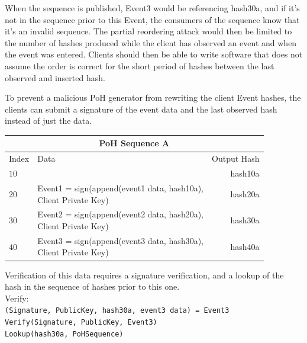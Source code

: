 \documentclass[12pt]{article}
\begin{document}
When the sequence is published, Event3 would be referencing hash30a, and if it’s not in the sequence prior to this Event, the consumers of the sequence know that it’s an invalid sequence. The partial reordering attack would then be limited to the number of hashes produced while the client has observed an event and when the event was entered. Clients should then be able to write software that does not assume the order is correct for the short period of hashes between the last observed and inserted hash.

To prevent a malicious PoH generator from rewriting the client Event hashes, the clients can submit a signature of the event data and the last observed hash instead of just the data.\\
\begin{center}
  \begin{tabular}{  l  l  r }
    \multicolumn{3}{c}{PoH Sequence A} \\
    \hline
    Index & Data & Output Hash \\ \hline
    $10$ & & hash10a  \\
    $20$ & \makecell{Event1 = sign(append(event1 data, hash10a), \\Client Private Key)} & hash20a\\
    $30$ & \makecell{Event2 = sign(append(event2 data, hash20a), \\Client Private Key)} & hash30a \\
    $40$ & \makecell{Event3 = sign(append(event3 data, hash30a), \\Client Private Key)} & hash40a \\

    \end{tabular}
\end{center}

Verification of this data requires a signature verification, and a lookup of the hash in the sequence of hashes prior to this one.\\
\noindent Verify:\\

\noindent\texttt{(Signature, PublicKey, hash30a, event3 data) = Event3} \\
\texttt{Verify(Signature, PublicKey, Event3)}\\
\texttt{Lookup(hash30a, PoHSequence)}\\
\end{document}
